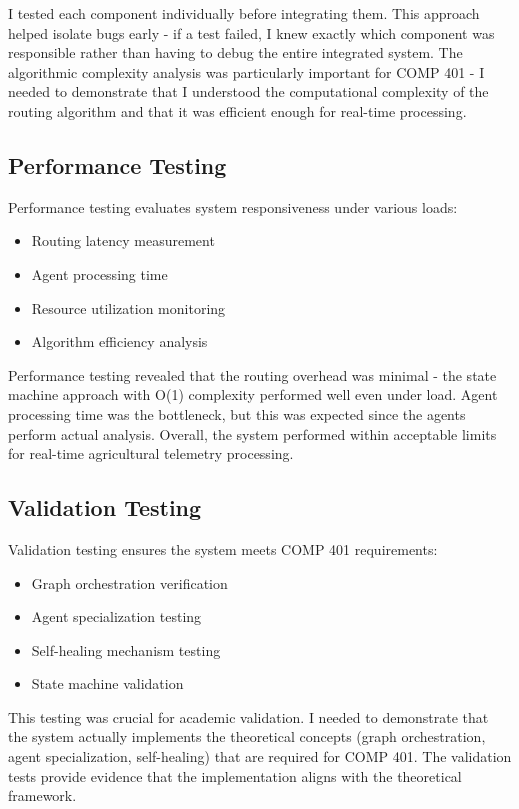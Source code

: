 I tested each component individually before integrating them. This approach helped isolate bugs early - if a test failed, I knew exactly which component was responsible rather than having to debug the entire integrated system. The algorithmic complexity analysis was particularly important for COMP 401 - I needed to demonstrate that I understood the computational complexity of the routing algorithm and that it was efficient enough for real-time processing.

\subsection{Performance Testing}

Performance testing evaluates system responsiveness under various loads:

\begin{itemize}
    \item Routing latency measurement
    \item Agent processing time
    \item Resource utilization monitoring
    \item Algorithm efficiency analysis
\end{itemize}

Performance testing revealed that the routing overhead was minimal - the state machine approach with O(1) complexity performed well even under load. Agent processing time was the bottleneck, but this was expected since the agents perform actual analysis. Overall, the system performed within acceptable limits for real-time agricultural telemetry processing.

\subsection{Validation Testing}

Validation testing ensures the system meets COMP 401 requirements:

\begin{itemize}
    \item Graph orchestration verification
    \item Agent specialization testing
    \item Self-healing mechanism testing
    \item State machine validation
\end{itemize}

This testing was crucial for academic validation. I needed to demonstrate that the system actually implements the theoretical concepts (graph orchestration, agent specialization, self-healing) that are required for COMP 401. The validation tests provide evidence that the implementation aligns with the theoretical framework.

